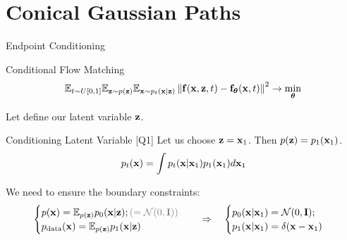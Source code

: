\documentclass{beamer}
\renewcommand{\eqpause}{}
\renewcommand{\nextonslide}[1]{#1}
\begin{document}
\section{Conical Gaussian Paths}
\begin{frame}{Endpoint Conditioning}
	\begin{block}{Conditional Flow Matching}
		\vspace{-0.5cm}
		\[
			\mathbb{E}_{t \sim U[0, 1]} \mathbb{E}_{\mathbf{z} \sim p(\mathbf{z})} \mathbb{E}_{\mathbf{x} \sim p_t(\mathbf{x} | \mathbf{z})}\left\| \mathbf{f}(\mathbf{x}, \mathbf{z}, t) - \mathbf{f}_{\boldsymbol{\theta}}(\mathbf{x}, t) \right\|^2 \rightarrow \min_{\boldsymbol{\theta}}
		\]
		\vspace{-0.5cm}
	\end{block}
	Let define our latent variable $\mathbf{z}$.
	\eqpause
	\begin{block}{Conditioning Latent Variable [Q1]}
		Let us choose $\mathbf{z} = \mathbf{x}_1$. Then $p(\mathbf{z}) = p_1(\mathbf{x}_1)$.
		\[
			p_t(\mathbf{x}) = \int p_t(\mathbf{x} | \mathbf{x}_1) p_1(\mathbf{x}_1) d \mathbf{x}_1
		\]
	\end{block}
	\vspace{-0.3cm}
	\eqpause
	We need to ensure the boundary constraints:
	\[
		\begin{cases}
			p(\bx) = \bbE_{p(\bz)} p_0(\bx | \bz); {\color{gray}(= \cN(0, \bI))} \\
			\pd(\bx) = \bbE_{p(\bz)} p_1(\bx | \bz)
		\end{cases}
		\quad 
		\nextonslide{
			\Rightarrow \quad 
			\begin{cases}
				p_0(\bx | \bx_1) = \cN(0, \bI); \\
				p_1(\bx | \bx_1) = \delta(\bx - \bx_1)
			\end{cases}
		}
	\]
	\vspace{-0.3cm}
\end{frame}
\end{document}
